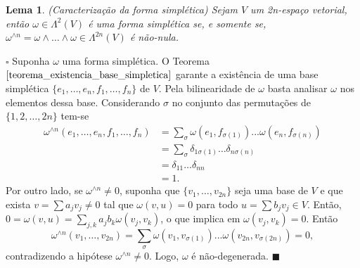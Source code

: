 \documentclass[12pt]{book}
\newtheorem{lema}[teorema]{Lema}
\newenvironment{prova}[1]{$\square$ #1}{\hfill$\blacksquare$}
\begin{document}
	\begin{lema}\label{lema_caracterizacao_forma_simpetica}
		(Caracterização da forma simplética) Sejam $V$ um 2n-espaço vetorial, então $\omega \in \Lambda^{2}(V)$ é uma forma simplética se, e somente se, $\omega^{\wedge n} = \omega\wedge \dots \wedge \omega \in \Lambda^{2n}(V)$ é não-nula.
	\end{lema}
	\begin{prova}
		Suponha $\omega$ uma forma simplética. O Teorema $\ref{teorema_existencia_base_simpletica}$ garante a existência de uma base simplética $\{e_{1}, \dots, e_{n}, f_{1}, \dots, f_{n}\}$ de $V$. Pela bilinearidade de $\omega$ basta analisar $\omega$ nos elementos dessa base. Considerando $\sigma$ no conjunto das permutações de $\{1, 2, \dots , 2n\}$ tem-se
		$$		
		\begin{aligned}
		\omega^{\wedge n}(e_{1}, \dots, e_{n}, f_{1}, \dots, f_{n}) &=\sum_{\sigma} \omega(e_{1}, f_{\sigma(1)})...\omega(e_{n}, f_{\sigma(n)})
		\\
		&= \sum_{\sigma}\delta_{1\sigma(1)}\dots\delta_{n\sigma(n)}
		\\
		&= \delta_{11}\dots\delta_{nn}
		\\
		&= 1.
		\end{aligned}
		$$
		Por outro lado, se $\omega^{\wedge n} \neq 0$, suponha que $\{v_{1},\dots, v_{2n}\}$ seja uma base de $V$ e que exista $v =\sum a_{j}v_{j} \neq 0$ tal que $\omega(v, u) = 0$ para todo $u=\sum b_{j}v_{j}  \in V$. Então, $0=\omega(v, u ) = \sum_{j, k} a_{j}b_{k}\omega(v_{j}, v_{k})$, o que implica em $\omega(v_{j}, v_{k}) =0$. Então 
		$$
		\omega^{\wedge n}(v_{1},\dots, v_{2n}) = \sum_{\sigma} \omega(v_{1}, v_{\sigma(1)})...\omega(v_{2n}, v_{\sigma(2n)})=0,
		$$
		contradizendo a hipótese $\omega^{\wedge n} \neq 0$. Logo, $\omega$ é não-degenerada.
	\end{prova}
	
\end{document}

